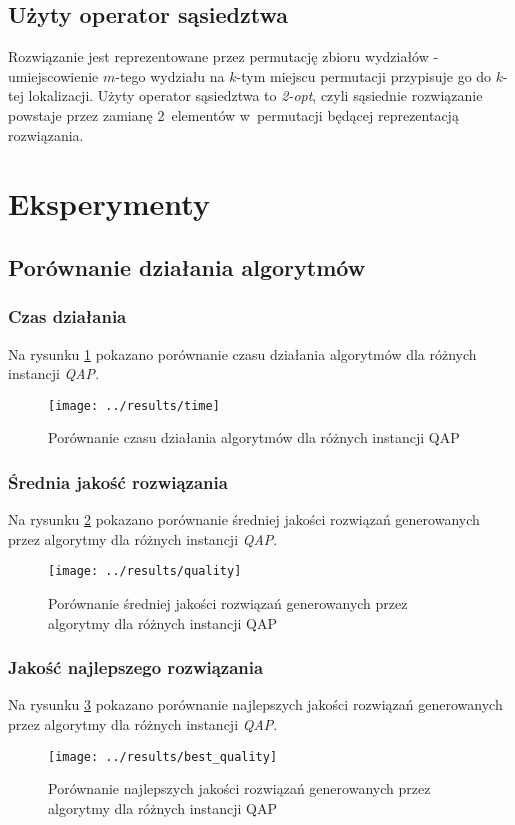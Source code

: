 \documentclass{article}
\begin{document}
	\subsection{Użyty operator sąsiedztwa}
	Rozwiązanie jest reprezentowane przez permutację zbioru wydziałów - umiejscowienie $m$-tego wydziału na $k$-tym miejscu permutacji przypisuje go do $k$-tej lokalizacji.
	Użyty operator sąsiedztwa to \emph{2-opt}, czyli sąsiednie rozwiązanie powstaje przez zamianę 2~elementów w~permutacji będącej reprezentacją rozwiązania.

\section{Eksperymenty}
	\subsection{Porównanie działania algorytmów}
		\subsubsection{Czas działania}Na rysunku \ref{fig:time} pokazano porównanie czasu działania algorytmów dla różnych instancji \emph{QAP}.
			\begin{figure}[h]
				\texttt{[image: ../results/time]}
				\caption{Porównanie czasu działania algorytmów dla różnych instancji QAP\label{fig:time}}
			\end{figure}

		\subsubsection{Średnia jakość rozwiązania}Na rysunku \ref{fig:quality} pokazano porównanie średniej jakości rozwiązań generowanych przez algorytmy dla różnych instancji \emph{QAP}.
			\begin{figure}[h]
				\texttt{[image: ../results/quality]}
				\caption{Porównanie średniej jakości rozwiązań generowanych przez algorytmy dla różnych instancji QAP\label{fig:quality}}
			\end{figure}

		\subsubsection{Jakość najlepszego rozwiązania}Na rysunku \ref{fig:best_quality} pokazano porównanie najlepszych jakości rozwiązań generowanych przez algorytmy dla różnych instancji \emph{QAP}.
		 	\begin{figure}[h]
				\texttt{[image: ../results/best\_quality]}
				\caption{Porównanie najlepszych jakości rozwiązań generowanych przez algorytmy dla różnych instancji QAP\label{fig:best_quality}}
			\end{figure}
\end{document}

